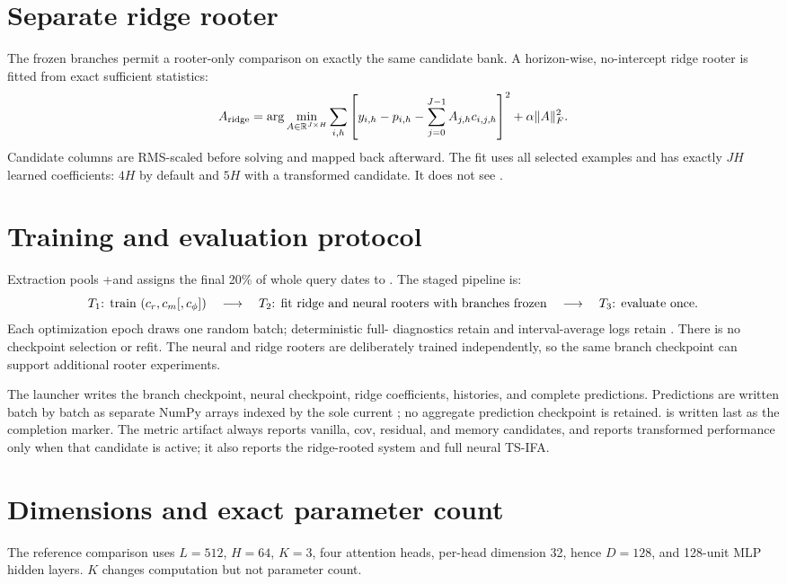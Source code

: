 \documentclass[10pt]{article}
\begin{document}
\section{Separate ridge rooter}
The frozen \Tone branches permit a rooter-only comparison on exactly the same
candidate bank.  A horizon-wise, no-intercept ridge rooter is fitted from exact
\Ttwo sufficient statistics:
\[
 A_{\rm ridge}=\arg\min_{A\in\mathbb R^{J\times H}}
 \sum_{i,h}\left[
 y_{i,h}-p_{i,h}-\sum_{j=0}^{J-1} A_{j,h}c_{i,j,h}
 \right]^2+\alpha\lVert A\rVert_F^2.
\]
Candidate columns are RMS-scaled before solving and mapped back afterward.
The fit uses all selected \Ttwo examples and has exactly $JH$ learned
coefficients: $4H$ by default and $5H$ with a transformed candidate.  It does
not see \Tthree.

\section{Training and evaluation protocol}
Extraction pools \Tone+\Ttwo and assigns the final 20\% of whole query dates
to \Ttwo.  The staged pipeline is:
\[
 \text{\ensuremath{T_1}: train }(c_r,c_m[,c_\phi])
 \quad\longrightarrow\quad
 \text{\ensuremath{T_2}: fit ridge and neural rooters with branches frozen}
 \quad\longrightarrow\quad
 \text{\ensuremath{T_3}: evaluate once}.
\]
Each optimization epoch draws one random batch; deterministic full-\Ttwo
diagnostics retain  and interval-average logs retain
.  There is no \Tthree checkpoint selection or refit.
The neural and ridge rooters are deliberately trained independently, so the
same branch checkpoint can support additional rooter experiments.

The launcher  writes the \Tone branch checkpoint, neural
checkpoint, ridge coefficients, histories, and complete \Tthree predictions.
Predictions are written batch by batch as separate NumPy arrays indexed by the
sole current ; no aggregate prediction
checkpoint is retained.   is written last as the
completion marker.
The metric artifact always reports vanilla, cov, residual, and memory
candidates, and reports transformed performance only when that candidate is
active; it also reports the ridge-rooted system and full neural TS-IFA.

\section{Dimensions and exact parameter count}
The reference comparison uses $L=512$, $H=64$, $K=3$, four attention heads,
per-head dimension 32, hence $D=128$, and 128-unit MLP hidden layers.  $K$
changes computation but not parameter count.
\end{document}
